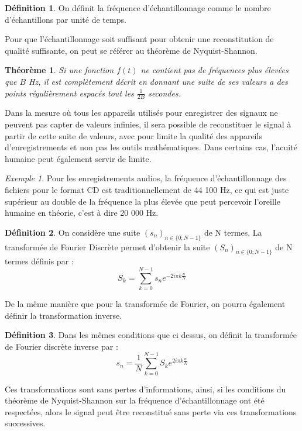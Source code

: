 \documentclass[]{article}
\newtheorem{mythm}{Théorème}
\theoremstyle{remark}
\newtheorem{myexmpl}{Exemple}
\theoremstyle{definition}
\newtheorem{mydef}{Définition}
\begin{document}
	\begin{mydef}
		On définit la fréquence d'échantillonnage comme le nombre d'échantillons par unité de temps.  
	\end{mydef}
		Pour que l'échantillonnage soit suffisant pour obtenir une reconstitution de qualité suffisante, on peut se référer au théorème de Nyquist-Shannon. 
		
	\begin{mythm}
		Si une fonction $f(t)$ ne contient pas de fréquences plus élevées que $B$ Hz, il est complètement décrit en donnant une suite de ses valeurs a des points régulièrement espacés tout les $\frac{1}{2B}$ secondes.
	\end{mythm}
	
	Dans la mesure où tous les appareils utilisés pour enregistrer des signaux ne peuvent pas capter de valeurs infinies, il sera possible de reconstituer le signal à partir de cette suite de valeurs, avec pour limite la qualité des appareils d'enregistrements et non pas les outils mathématiques. Dans certains cas, l'acuité humaine peut également servir de limite.
	
	\begin{myexmpl}
		 Pour les enregistrements audios, la fréquence d'échantillonnage des fichiers pour le format CD est traditionnellement de 44 100 Hz, ce qui est juste supérieur au double de la fréquence la plus élevée que peut percevoir l'oreille humaine en théorie, c'est à dire 20 000 Hz. 
	\end{myexmpl}
	
	\begin{mydef}
			On considère une suite $(s_n)_{n\in \{0; N -1 \}}$ de N termes. La transformée de Fourier Discrète permet d'obtenir la suite  $(S_n)_{n\in \{0; N -1 \}}$ de N termes définis par :
			$$ S_k = \sum_{k=0}^{N-1}s_n e^{-2i\pi k\frac{n}{N}} $$
	\end{mydef}
		De la même manière que pour la transformée de Fourier, on pourra également définir la transformation inverse.
		
	\begin{mydef}
		Dans les mêmes conditions que ci dessus, on définit la transformée de Fourier discrète inverse par :
			$$ s_n =\frac{1}{N} \sum_{k=0}^{N-1}S_k e^{2i\pi k\frac{n}{N}} $$
	\end{mydef}
	
	Ces transformations sont sans pertes d'informations, ainsi, si les conditions du théorème de Nyquist-Shannon sur la fréquence d'échantillonnage ont été respectées, alors le signal peut être reconstitué sans perte via ces transformations successives. 
	
\end{document}

